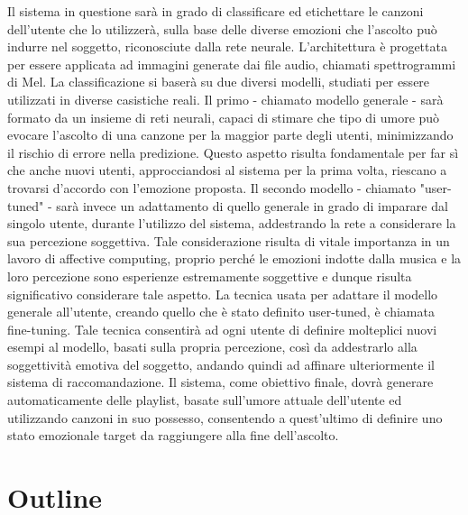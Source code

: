 \documentclass[11pt]{report}
\begin{document}
Il sistema in questione sarà in grado di classificare ed etichettare le canzoni dell'utente che lo utilizzerà, sulla base delle diverse emozioni che l'ascolto può indurre nel soggetto, riconosciute dalla rete neurale. L'architettura è progettata per essere applicata ad immagini generate dai file audio, chiamati spettrogrammi di Mel. La classificazione si baserà su due diversi modelli, studiati per essere utilizzati in diverse casistiche reali. Il primo - chiamato modello generale - sarà formato da un insieme di reti neurali, capaci di stimare che tipo di umore può evocare l'ascolto di una canzone per la maggior parte degli utenti, minimizzando il rischio di errore nella predizione. Questo aspetto risulta fondamentale per far sì che anche nuovi utenti, approcciandosi al sistema per la prima volta, riescano a trovarsi d'accordo con l'emozione proposta. Il secondo modello - chiamato "user-tuned" - sarà invece un adattamento di quello generale in grado di imparare dal singolo utente, durante l'utilizzo del sistema, addestrando la rete a considerare la sua percezione soggettiva. Tale considerazione risulta di vitale importanza in un lavoro di affective computing, proprio perché le emozioni indotte dalla musica e la loro percezione sono esperienze estremamente soggettive e dunque risulta significativo considerare tale aspetto. La tecnica usata per adattare il modello generale all'utente, creando quello che è stato definito user-tuned, è chiamata fine-tuning. Tale tecnica consentirà ad ogni utente di definire molteplici nuovi esempi al modello, basati sulla propria percezione, così da addestrarlo alla soggettività emotiva del soggetto, andando quindi ad affinare ulteriormente il sistema di raccomandazione. Il sistema, come obiettivo finale, dovrà generare automaticamente delle playlist, basate sull'umore attuale dell'utente ed utilizzando canzoni in suo possesso, consentendo a quest'ultimo di definire uno stato emozionale target da raggiungere alla fine dell'ascolto.\\



\section{Outline}
\end{document}

